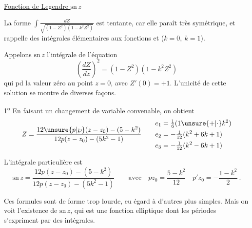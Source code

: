 \begingroup\makeatletter\tagsleft@true\makeatother
\uline{Fonction de Legendre $\mathrm{sn}\,z$}

La forme $\displaystyle\int\frac{dZ}{\sqrt{(1-Z^2)(1-k^2 Z^2)}}$ est tentante, car elle paraît très symétrique, et rappelle des intégrales élémentaires  aux fonctions  et  ($k=0,\ k=1$).

Appelons $\mathrm{sn}\,z$ l'intégrale de l'équation
\[
\left(\frac{dZ}{dz}\right)^2=(1-Z^2)(1-k^2Z^2)
\]
qui pd la valeur zéro au point $z=0$, avec $Z'(0)=+1$. L'unicité de cette solution se montre de diverses façons.

1\textsuperscript{o} En faisant un changement de variable convenable, on obtient
\[
Z=\frac{12\unsure{p|\wp}(z-z_0)-(5-k^2)}{12p(z-z_0)-(5k^2-1)}
\qquad
\begin{aligned}
e_1&=\tfrac16(1\unsure{+|\cdot}k^2)\\
e_2&=-\tfrac1{12}(k^2+6k+1)\\
e_3&=-\tfrac1{12}(k^2-6k+1)
\end{aligned}
\]

L'intégrale particulière est
\[
\mathrm{sn}\,z=\frac{12p(z-z_0)-(5-k^2)}{12p(z-z_0)-(5k^2-1)}
\qquad\text{avec}\quad pz_0=\frac{5-k^2}{12}\quad p'z_0=-\frac{1-k^2}{2}\ .\tag*{(1)}
\]

Ces formules sont de forme trop lourde, eu égard à d'autres plus simples. Mais on voit l'existence de $\mathrm{sn}\,z$, qui est une fonction elliptique dont les périodes s'expriment par des intégrales.

\endgroup

